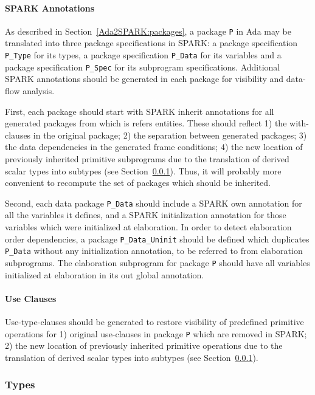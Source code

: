 \documentclass{article}
\begin{document}
\paragraph{SPARK Annotations}

As described in Section~\ref{Ada2SPARK:packages}, a package \verb|P| in Ada may
be translated into three package specifications in SPARK: a package
specification \verb|P_Type| for its types, a package specification
\verb|P_Data| for its variables and a package specification \verb|P_Spec| for
its subprogram specifications. Additional SPARK annotations should be generated
in each package for visibility and data-flow analysis.

First, each package should start with SPARK inherit annotations for all
generated packages from which is refers entities. These should reflect 1) the
with-clauses in the original package; 2) the separation between generated
packages; 3) the data dependencies in the generated frame conditions; 4) the
new location of previously inherited primitive subprograms due to the
translation of derived scalar types into subtypes (see
Section~\ref{SPARK2SPARK:types}). Thus, it will probably more convenient to
recompute the set of packages which should be inherited.

Second, each data package \verb|P_Data| should include a SPARK own annotation
for all the variables it defines, and a SPARK initialization annotation for
those variables which were initialized at elaboration. In order to detect
elaboration order dependencies, a package \verb|P_Data_Uninit| should be
defined which duplicates \verb|P_Data| without any initialization annotation,
to be referred to from elaboration subprograms. The elaboration subprogram for
package \verb|P| should have all variables initialized at elaboration in its
out global annotation.

\paragraph{Use Clauses}

Use-type-clauses should be generated to restore visibility of predefined
primitive operations for 1) original use-clauses in package \verb|P| which are
removed in SPARK; 2) the new location of previously inherited primitive
operations due to the translation of derived scalar types into subtypes (see
Section~\ref{SPARK2SPARK:types}).

\subsubsection{Types}
\label{SPARK2SPARK:types}
\end{document}
